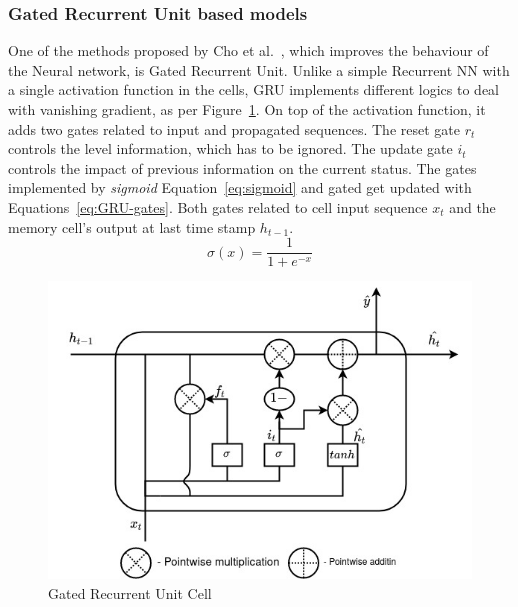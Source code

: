 \subsubsection{Gated Recurrent Unit based models} \label{subsub:gru}
One of the methods proposed by Cho et al.~\cite{GRU_cho_properties_2014}, which improves the behaviour of the Neural network, is Gated Recurrent Unit.
Unlike a simple Recurrent NN with a single activation function in the cells, GRU implements different logics to deal with vanishing gradient, as per \mbox{Figure~\ref{fig:GRU-cell}}.
On top of the activation function, it adds two gates related to input and propagated sequences.
The reset gate $r_t$ controls the level information, which has to be ignored.
The update gate $i_t$ controls the impact of previous information on the current status.
The gates implemented by \textit{sigmoid} \mbox{Equation~\ref{eq:sigmoid}} and gated get updated with \mbox{Equations~\ref{eq:GRU-gates}}.
Both gates related to cell input sequence $x_t$ and the memory cell's output at last time stamp $h_{t-1}$.
\begin{equation}
    \sigma(x) = \frac{1}{1+e^{-x}}
    \label{eq:sigmoid}
\end{equation}
\begin{figure}[ht]%
    \centering
    \includegraphics[width=\linewidth]{II_Body/GRU/images/GRU.jpg}
    \caption{Gated Recurrent Unit Cell}
    \label{fig:GRU-cell}
\end{figure}

